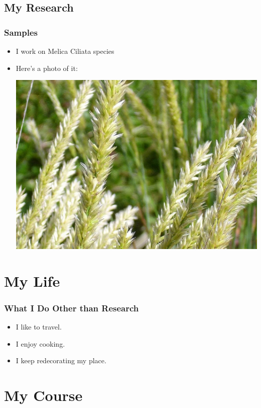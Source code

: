 \documentclass[12pt]{beamer}\usepackage[]{graphicx}\usepackage[]{color}
\begin{document}
\subsection{My Research}
\begin{frame}
\frametitle{Samples}
\begin{itemize}
\item<1-> I work on Melica Ciliata species
\item<2-> Here's a photo of it:

\vspace{.25cm}
\includegraphics[width=0.5\columnwidth]{melica_ciliata.jpg}
\end{itemize}

\end{frame}



\section{My Life}
\begin{frame}
\frametitle{What I Do Other than Research}
\begin{itemize}
  \item I like to travel.
  \item I enjoy cooking.
  \item I keep redecorating my place.
\end{itemize}
\end{frame}

\section{My Course}
\end{document}
